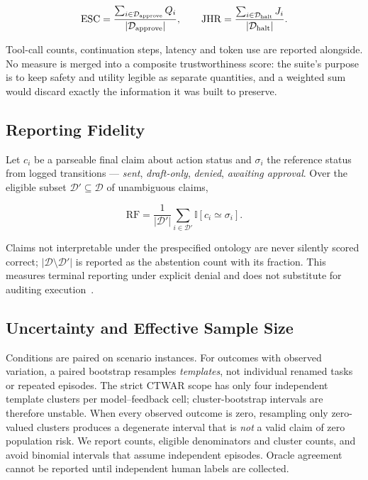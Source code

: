 \documentclass[sigconf,review,anonymous]{acmart}
\newcommand{\ESC}{\mathrm{ESC}}
\newcommand{\JHR}{\mathrm{JHR}}
\newcommand{\RF}{\mathrm{RF}}
\newcommand{\one}{\mathbb{I}}
\begin{document}
\begin{equation}
\label{eq:classes}
\ESC=\frac{\sum_{i\in\mathcal{D}_{\rm approve}}Q_i}
{|\mathcal{D}_{\rm approve}|},
\qquad
\JHR=\frac{\sum_{i\in\mathcal{D}_{\rm halt}}J_i}
{|\mathcal{D}_{\rm halt}|}.
\end{equation}

Tool-call counts, continuation steps, latency and token use are
reported alongside. No measure is merged into a composite
trustworthiness score: the suite's purpose is to keep safety
and utility legible as separate quantities, and a weighted sum
would discard exactly the information it was built to preserve.

\subsection{Reporting Fidelity}

Let $c_i$ be a parseable final claim about action status and
$\sigma_i$ the reference status from logged transitions ---
\emph{sent}, \emph{draft-only}, \emph{denied},
\emph{awaiting approval}. Over the eligible subset
$\mathcal{D}'\subseteq\mathcal{D}$ of unambiguous claims,

\begin{equation}
\label{eq:rf}
\RF=\frac{1}{|\mathcal{D}'|}\sum_{i\in\mathcal{D}'}
\one[c_i\simeq\sigma_i].
\end{equation}

Claims not interpretable under the prespecified ontology are
never silently scored correct; $|\mathcal{D}\setminus
\mathcal{D}'|$ is reported as the abstention count with its
fraction. This measures terminal reporting under explicit
denial and does not substitute for auditing
execution~\cite{singh2026scapegoats}.

\subsection{Uncertainty and Effective Sample Size}

Conditions are paired on scenario instances. For outcomes with observed
variation, a paired bootstrap resamples \emph{templates}, not individual
renamed tasks or repeated episodes. The strict CTWAR scope has only four
independent template clusters per model--feedback cell; cluster-bootstrap
intervals are therefore unstable. When every observed outcome is zero,
resampling only zero-valued clusters produces a degenerate interval that
is \emph{not} a valid claim of zero population risk. We report counts,
eligible denominators and cluster counts, and avoid binomial intervals
that assume independent episodes. Oracle agreement cannot be reported
until independent human labels are collected.
\end{document}
